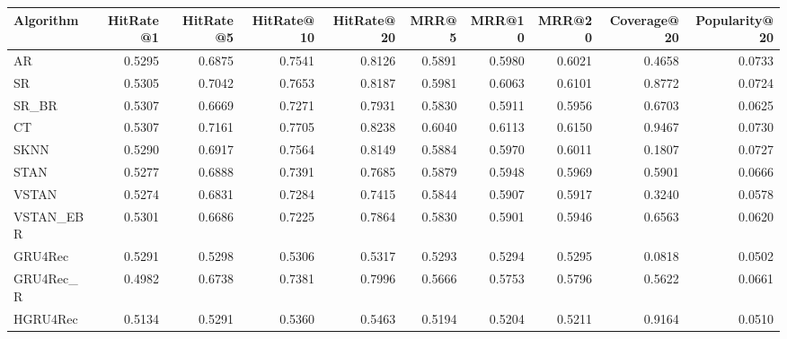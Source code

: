 \begin{tabular}{lrrrrrrrrr}
\toprule
 Algorithm &  HitRate@1 &  HitRate@5 &  HitRate@10 &  HitRate@20 &   MRR@5 &  MRR@10 &  MRR@20 &  Coverage@20 &  Popularity@20 \\
\midrule
        AR &     0.5295 &     0.6875 &      0.7541 &      0.8126 &  0.5891 &  0.5980 &  0.6021 &       0.4658 &         0.0733 \\
        SR &     0.5305 &     0.7042 &      0.7653 &      0.8187 &  0.5981 &  0.6063 &  0.6101 &       0.8772 &         0.0724 \\
     SR\_BR &     0.5307 &     0.6669 &      0.7271 &      0.7931 &  0.5830 &  0.5911 &  0.5956 &       0.6703 &         0.0625 \\
        CT &     0.5307 &     0.7161 &      0.7705 &      0.8238 &  0.6040 &  0.6113 &  0.6150 &       0.9467 &         0.0730 \\
      SKNN &     0.5290 &     0.6917 &      0.7564 &      0.8149 &  0.5884 &  0.5970 &  0.6011 &       0.1807 &         0.0727 \\
      STAN &     0.5277 &     0.6888 &      0.7391 &      0.7685 &  0.5879 &  0.5948 &  0.5969 &       0.5901 &         0.0666 \\
     VSTAN &     0.5274 &     0.6831 &      0.7284 &      0.7415 &  0.5844 &  0.5907 &  0.5917 &       0.3240 &         0.0578 \\
 VSTAN\_EBR &     0.5301 &     0.6686 &      0.7225 &      0.7864 &  0.5830 &  0.5901 &  0.5946 &       0.6563 &         0.0620 \\
   GRU4Rec &     0.5291 &     0.5298 &      0.5306 &      0.5317 &  0.5293 &  0.5294 &  0.5295 &       0.0818 &         0.0502 \\
 GRU4Rec\_R &     0.4982 &     0.6738 &      0.7381 &      0.7996 &  0.5666 &  0.5753 &  0.5796 &       0.5622 &         0.0661 \\
  HGRU4Rec &     0.5134 &     0.5291 &      0.5360 &      0.5463 &  0.5194 &  0.5204 &  0.5211 &       0.9164 &         0.0510 \\
\bottomrule
\end{tabular}
